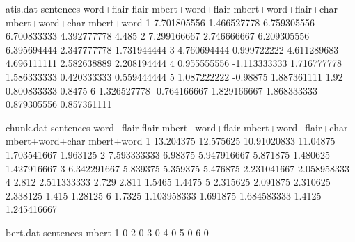 \documentclass[11pt,a4paper]{article}
\begin{document}
\begin{filecontents}{atis.dat}
sentences word+flair flair mbert+word+flair mbert+word+flair+char mbert+word+char mbert+word
1 7.701805556 1.466527778 6.759305556 6.700833333 4.392777778 4.485
2 7.299166667 2.746666667 6.209305556 6.395694444 2.347777778 1.731944444
3 4.760694444 0.999722222 4.611289683 4.696111111 2.582638889 2.208194444
4 0.955555556 -1.113333333 1.716777778 1.586333333 0.420333333 0.559444444
5 1.087222222 -0.98875 1.887361111 1.92 0.800833333 0.8475
6 1.326527778 -0.764166667 1.829166667 1.868333333 0.879305556 0.857361111
\end{filecontents}

\begin{filecontents}{chunk.dat}
sentences word+flair flair mbert+word+flair mbert+word+flair+char mbert+word+char mbert+word
1 13.204375 12.575625 10.91020833 11.04875 1.703541667 1.963125
2 7.593333333 6.98375 5.947916667 5.871875 1.480625 1.427916667
3 6.342291667 5.839375 5.359375 5.476875 2.231041667 2.058958333
4 2.812 2.511333333 2.729 2.811 1.5465 1.4475
5 2.315625 2.091875 2.310625 2.338125 1.415 1.28125
6 1.7325 1.103958333 1.691875 1.684583333 1.4125 1.245416667
\end{filecontents}

\begin{filecontents}{bert.dat}
sentences mbert
1 0
2 0 
3 0 
4 0 
5 0 
6 0
\end{filecontents}
\end{document}
